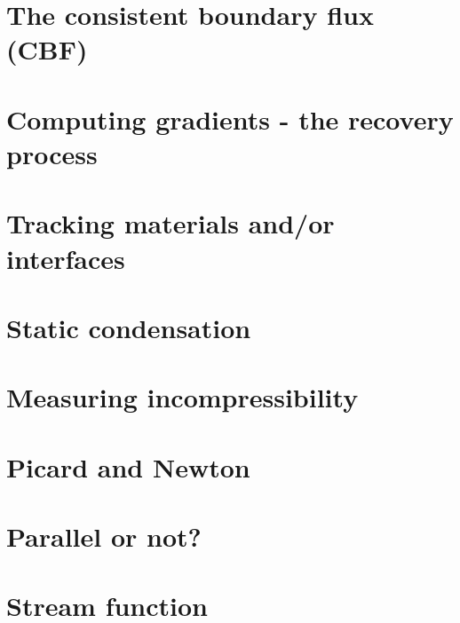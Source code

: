 \section{The consistent boundary flux (CBF) \label{ss:cbf}}  %
\newpage %
\section{Computing gradients - the recovery process \label{ss:gradrecovery}}  %
\newpage %
\section{Tracking materials and/or interfaces}  %
\newpage %
\section{Static condensation}  %
\newpage %
\section{Measuring incompressibility \label{ss_incomp}}  %
\newpage %
\section{Picard and Newton \label{ss_nonlinear}}  %
\newpage %
\section{Parallel or not?} \label{sec:parallel}  %
\newpage %
\section{Stream function} \label{sec:streamfunction}  %
\newpage %
